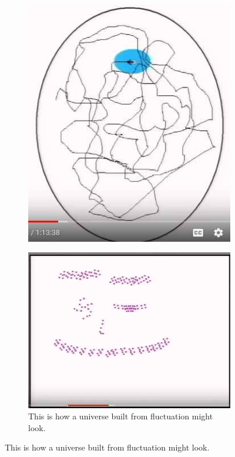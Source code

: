 \documentclass[]{article}
\begin{document}
\begin{figure}[H]
\begin{subfigure}[b]{0.3\textwidth}
		\includegraphics[width=\textwidth]{time-univers-passes-through-every-possible-state}
	\end{subfigure}
	\begin{subfigure}[b]{0.3\textwidth}
		\caption{This is how a universe built from fluctuation might look.}\label{fig:time-universe-from-fluctuation}
		\includegraphics[width=\textwidth]{time-universe-from-fluctuation}
	\end{subfigure}
\end{figure}
\end{document}
